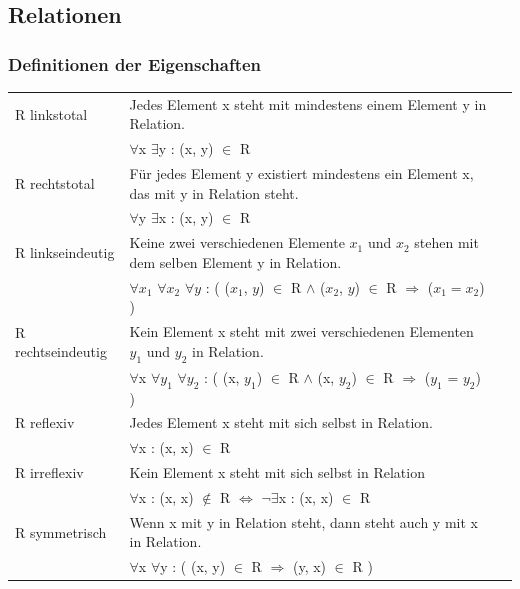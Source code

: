 \documentclass[6pt,a4paper]{scrartcl}
\begin{document}

\begin{multicols*}{2}

\subsection{Relationen}
\subsubsection{Definitionen der Eigenschaften}
\begin{tabular}{lll}
R linkstotal	    & Jedes Element x steht mit mindestens einem Element y in Relation.								\\
& $\forall$x $\exists$y : (x, y) $\in$ R \\
R rechtstotal		& Für jedes Element y existiert mindestens ein Element x, das mit y in Relation steht.				\\
& $\forall$y $\exists$x : (x, y) $\in$ R \\
R linkseindeutig	& Keine zwei verschiedenen Elemente $x_1$ und $x_2$ stehen mit dem selben Element y in Relation.	\\
& $\forall x_1$ $\forall x_2$ $\forall y$ : ( ($x_1$, $y$) $\in$ R $\land$ ($x_2$, $y$) $\in$ R $\Rightarrow$ ($x_1 = x_2$) ) \\
R rechtseindeutig	& Kein Element x steht mit zwei verschiedenen Elementen $y_1$ und $y_2$ in Relation.				\\
& $\forall$x $\forall y_1$ $\forall y_2$ : ( (x, $y_1$) $\in$ R $\land$ (x, $y_2$) $\in$ R $\Rightarrow$ ($y_1$ = $y_2$) ) \\
R reflexiv			& Jedes Element x steht mit sich selbst in Relation.												\\
& $\forall$x : (x, x) $\in$ R \\
R irreflexiv	    & Kein Element x steht mit sich selbst in Relation												\\
& $\forall$x : (x, x) $\notin$ R $\Leftrightarrow$ $\lnot\exists$x : (x, x) $\in$ R \\
R symmetrisch		& Wenn x mit y in Relation steht, dann steht auch y mit x in Relation.							\\
& $\forall$x $\forall$y : ( (x, y) $\in$ R $\Rightarrow$ (y, x) $\in$ R ) \\

\end{tabular}
\end{multicols*}
\end{document}
